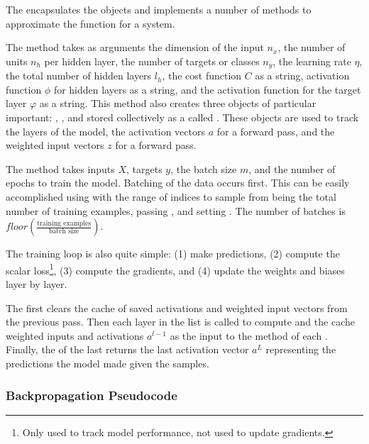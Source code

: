 \documentclass{article}
\begin{document}
The  encapsulates the  objects and
implements a number of methods to approximate the function for a system.

The  method takes as arguments the dimension of the input
$n_x$, the number of units $n_h$ per hidden layer, the number of targets or
classes $n_y$, the learning rate $\eta$, the total number of hidden layers $l_h$,
the cost function $C$ as a string, activation function $\phi$ for hidden layers as a string,
and the activation function for the target layer $\varphi$ as a string. This method
also creates three  objects of particular important:
, , and
 stored collectively as a 
called . These  objects are used to
track the layers of the model, the activation vectors $a$ for a forward pass,
and the weighted input vectors $z$ for a forward pass.

The  method takes inputs $X$, targets $y$, the batch size $m$,
and the number of epochs to train the model. Batching of the data occurs first.
This can be easily accomplished using  with
the range of indices to sample from being the total number of training examples,
passing , and setting .
The number of batches is $floor(\frac{\text{training examples}}{\text{batch size}})$.

The training loop is also quite simple: (1) make predictions, (2) compute the scalar
loss\footnote{Only used to track model performance, not used to
	update gradients.},
(3) compute the gradients, and (4) update the weights and biases layer by layer.

The  first clears the cache of saved activations and
weighted input vectors from the previous pass. Then each layer in the
 list is called to compute and the cache weighted inputs and
activations $a^{l-1}$ as the input to the  method of each .
Finally, the  of the last  returns the
last activation vector $a^{L}$ representing the predictions the model made given the samples.

\subsubsection{Backpropagation Pseudocode}
\end{document}
